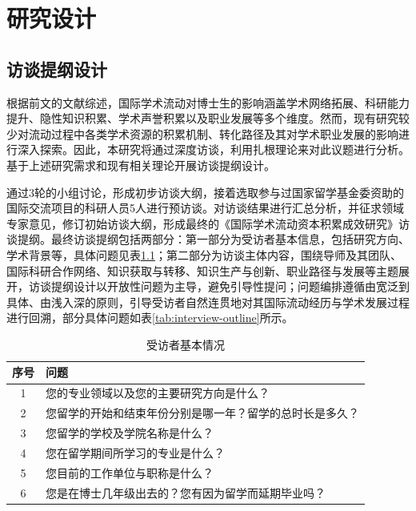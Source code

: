 \chapter{研究设计}

\section{访谈提纲设计}

根据前文的文献综述，国际学术流动对博士生的影响涵盖学术网络拓展、科研能力提升、隐性知识积累、学术声誉积累以及职业发展等多个维度。然而，现有研究较少对流动过程中各类学术资源的积累机制、转化路径及其对学术职业发展的影响进行深入探索。因此，本研究将通过深度访谈，利用扎根理论来对此议题进行分析。基于上述研究需求和现有相关理论开展访谈提纲设计。

通过3轮的小组讨论，形成初步访谈大纲，接着选取参与过国家留学基金委资助的国际交流项目的科研人员5人进行预访谈。对访谈结果进行汇总分析，并征求领域专家意见，修订初始访谈大纲，形成最终的《国际学术流动资本积累成效研究》访谈提纲。最终访谈提纲包括两部分：第一部分为受访者基本信息，包括研究方向、学术背景等，具体问题见表\ref{tab:basic-questions}；第二部分为访谈主体内容，围绕导师及其团队、国际科研合作网络、知识获取与转移、知识生产与创新、职业路径与发展等主题展开，访谈提纲设计以开放性问题为主导，避免引导性提问；问题编排遵循由宽泛到具体、由浅入深的原则，引导受访者自然连贯地对其国际流动经历与学术发展过程进行回溯，部分具体问题如表\ref{tab:interview-outline}所示。

\begin{table}[htbp]
\centering
\caption{受访者基本情况}
\label{tab:basic-questions}
\begin{tabular}{cl}
\toprule
序号 & 问题 \\
\midrule
1 & 您的专业领域以及您的主要研究方向是什么？ \\
2 & 您留学的开始和结束年份分别是哪一年？留学的总时长是多久？ \\
3 & 您留学的学校及学院名称是什么？ \\
4 & 您在留学期间所学习的专业是什么？ \\
5 & 您目前的工作单位与职称是什么？ \\
6 & 您是在博士几年级出去的？您有因为留学而延期毕业吗？ \\
\bottomrule
\end{tabular}
\end{table}

